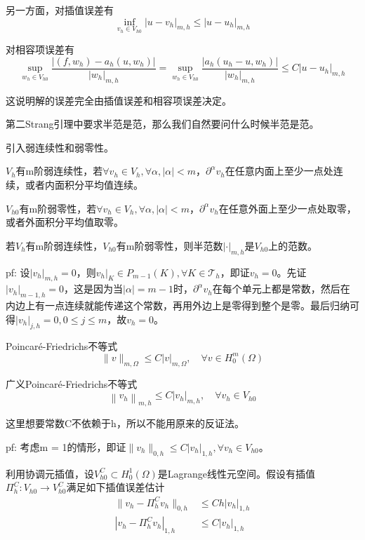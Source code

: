另一方面，对插值误差有
\[
  \inf_{v_{h} \in V_{h 0}}\left|u-v_{h}\right|_{m, h} \le\left|u-u_{h}\right|_{m, h}
\]

对相容项误差有
\[
  \sup _{w_{h} \in V_{h 0}} \frac{\left|\left(f, w_{h}\right)-a_{h}\left(u, w_{h}\right)\right|}{\left|w_{h}\right|_{m, h}}=\sup _{w_{h} \in V_{h 0}} \frac{\left|a_{h}\left(u_{h}-u, w_{h}\right)\right|}{\left|w_{h}\right|_{m, h}} \le C\left|u-u_{h}\right|_{m, h}
\]

这说明解的误差完全由插值误差和相容项误差决定。

第二Strang引理中要求半范是范，那么我们自然要问什么时候半范是范。

引入弱连续性和弱零性。

$V_h$有m阶弱连续性，若$\forall v_h \in V_h, \forall \alpha, |\alpha| < m$，$\partial^{\alpha} v_h$在任意内面上至少一点处连续，或者内面积分平均值连续。

$V_{h0}$有m阶弱零性，若$\forall v_h \in V_h, \forall \alpha, |\alpha| < m$，$\partial^{\alpha} v_h$在任意外面上至少一点处取零，或者外面积分平均值取零。

若$V_h$有m阶弱连续性，$V_{h0}$有m阶弱零性，则半范数$|\cdot|_{m, h}$是$V_{h0}$上的范数。

pf: 设$|v_h|_{m, h} = 0$，则$v_h|_K \in P_{m - 1}(K), \forall K \in \mathcal{T}_h$，即证$v_h = 0$。先证$|v_h|_{m - 1, h} = 0$，这是因为当$|\alpha| = m - 1$时，$\partial^{\alpha} v_h$在每个单元上都是常数，然后在内边上有一点连续就能传递这个常数，再用外边上是零得到整个是零。最后归纳可得$|v_h|_{j, h} = 0, 0 \le j \le m$，故$v_h = 0$。

Poincaré-Friedrichs不等式
\[
  \|v\|_{m, \Omega} \le C |v|_{m, \Omega}, \quad \forall v \in H_{0}^{m}(\Omega)
\]

广义Poincaré-Friedrichs不等式
\[
  \left\|v_{h}\right\|_{m, h} \le C|v_{h}|_{m, h}, \quad \forall v_{h} \in V_{h 0}
\]

这里想要常数C不依赖于h，所以不能用原来的反证法。

pf: 考虑m = 1的情形，即证$\|v_{h}\|_{0, h} \le C|v_{h}|_{1, h}, \forall v_{h} \in V_{h 0}$。

利用协调元插值，设$V_{h 0}^{C} \subset H_{0}^{1}(\Omega)$是Lagrange线性元空间。假设有插值$\Pi_{h}^{C}: V_{h 0} \rightarrow V_{h 0}^{C}$满足如下插值误差估计
\[
  \begin{aligned}
    \|v_h - \Pi_{h}^{C} v_h\|_{0, h} &\le Ch |v_h|_{1, h}\\
    |v_h - \Pi_{h}^{C} v_h|_{1, h} &\le C |v_h|_{1, h}
  \end{aligned}
\]

